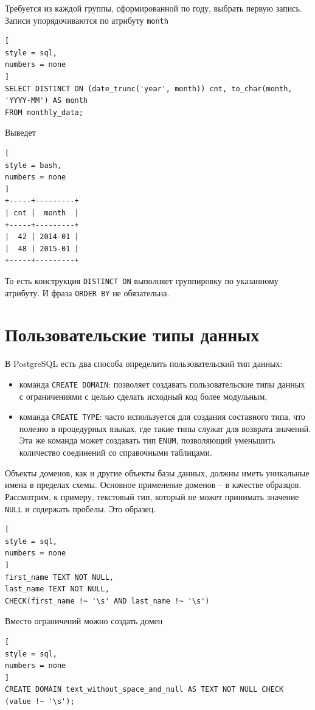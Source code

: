 \documentclass[%
	11pt,
	a4paper,
	utf8,
		]{article}
\begin{document}
Требуется из каждой группы, сформированной по году, выбрать первую запись. Записи упорядочиваются по атрибуту \texttt{month}
\begin{lstlisting}[
style = sql,
numbers = none
]
SELECT DISTINCT ON (date_trunc('year', month)) cnt, to_char(month, 'YYYY-MM') AS month 
FROM monthly_data;
\end{lstlisting}

Выведет
\begin{lstlisting}[
style = bash,
numbers = none
]
+-----+---------+
| cnt |  month  |
+-----+---------+
|  42 | 2014-01 |
|  48 | 2015-01 |
+-----+---------+
\end{lstlisting}

То есть конструкция \texttt{DISTINCT ON} выполняет группировку по указанному атрибуту. И фраза \texttt{ORDER BY} не обязательна.

\section{Пользовательские типы данных}

В PostgreSQL есть два способа определить пользовательский тип данных:
\begin{itemize}
	\item команда \texttt{CREATE DOMAIN}: позволяет создавать пользовательские типы данных с ограничениями с целью сделать исходный код более модульным,
	
	\item команда \texttt{CREATE TYPE}: часто используется для создания составного типа, что полезно в процедурных языках, где такие типы служат для возврата значений. Эта же команда может создавать тип \texttt{ENUM}, позволяющий уменьшить количество соединений со справочными таблицами.
\end{itemize}

Объекты доменов, как и другие объекты базы данных, должны иметь уникальные имена в пределах схемы. Основное применение доменов -- в качестве образцов. Рассмотрим, к примеру, текстовый тип, который не может принимать значение \texttt{NULL} и содержать пробелы. Это образец.
\begin{lstlisting}[
style = sql,
numbers = none
]
first_name TEXT NOT NULL,
last_name TEXT NOT NULL,
CHECK(first_name !~ '\s' AND last_name !~ '\s')
\end{lstlisting}

Вместо ограничений можно создать домен
\begin{lstlisting}[
style = sql,
numbers = none
]
CREATE DOMAIN text_without_space_and_null AS TEXT NOT NULL CHECK (value !~ '\s');
\end{lstlisting}
\end{document}
